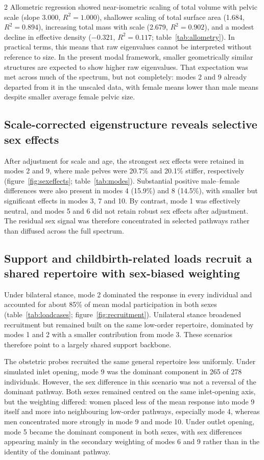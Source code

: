 \documentclass[openacc]{rsproca_new}
\begin{document}
\begin{multicols}{2}
Allometric regression showed near-isometric scaling of total volume with pelvic scale (slope 3.000, $R^2 = 1.000$), shallower scaling of total surface area (1.684, $R^2 = 0.894$), increasing total mass with scale (2.679, $R^2 = 0.902$), and a modest decline in effective density ($-0.321$, $R^2 = 0.117$; table~\ref{tab:allometry}). In practical terms, this means that raw eigenvalues cannot be interpreted without reference to size. In the present modal framework, smaller geometrically similar structures are expected to show higher raw eigenvalues. That expectation was met across much of the spectrum, but not completely: modes 2 and 9 already departed from it in the unscaled data, with female means lower than male means despite smaller average female pelvic size.

\subsection{Scale-corrected eigenstructure reveals selective sex effects}

After adjustment for scale and age, the strongest sex effects were retained in modes 2 and 9, where male pelves were 20.7\% and 20.1\% stiffer, respectively (figure~\ref{fig:sexeffects}; table~\ref{tab:modes}). Substantial positive male--female differences were also present in modes 4 (15.9\%) and 8 (14.5\%), with smaller but significant effects in modes 3, 7 and 10. By contrast, mode 1 was effectively neutral, and modes 5 and 6 did not retain robust sex effects after adjustment. The residual sex signal was therefore concentrated in selected pathways rather than diffused across the full spectrum.

\subsection{Support and childbirth-related loads recruit a shared repertoire with sex-biased weighting}

Under bilateral stance, mode 2 dominated the response in every individual and accounted for about 85\% of mean modal participation in both sexes (table~\ref{tab:loadcases}; figure~\ref{fig:recruitment}). Unilateral stance broadened recruitment but remained built on the same low-order repertoire, dominated by modes 1 and 2 with a smaller contribution from mode 3. These scenarios therefore point to a largely shared support backbone.

The obstetric probes recruited the same general repertoire less uniformly. Under simulated inlet opening, mode 9 was the dominant component in 265 of 278 individuals. However, the sex difference in this scenario was not a reversal of the dominant pathway. Both sexes remained centred on the same inlet-opening axis, but the weighting differed: women placed less of the mean response into mode 9 itself and more into neighbouring low-order pathways, especially mode 4, whereas men concentrated more strongly in mode 9 and mode 10. Under outlet opening, mode 5 became the dominant component in both sexes, with sex differences appearing mainly in the secondary weighting of modes 6 and 9 rather than in the identity of the dominant pathway.


\end{multicols}
\end{document}
